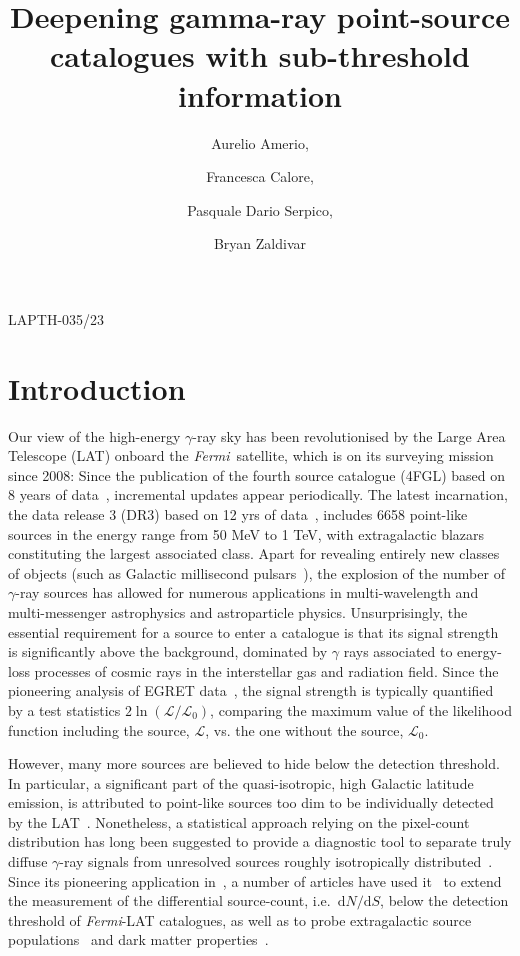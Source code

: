 \documentclass{article}
\date{}
\title{Deepening gamma-ray point-source catalogues with sub-threshold information}
\author[a, 1]{Aurelio Amerio,\note{Corresponding author.}}
\author[b]{Francesca Calore,}
\author[b]{Pasquale Dario Serpico,}
\author[a]{Bryan Zaldivar}
\affiliation[a]{Instituto de F\'isica Corpuscular (IFIC), University of Valencia and CSIC, Calle Catedrático José Beltrán 2, 46980 Paterna, Spain}
\affiliation[b]{Laboratoire d'Annecy de Physique Th\'eorique (LAPTh), CNRS, Univ. Savoie Mont Blanc, F-74940 Annecy, France}
\def\d{\textrm{d}}
\newcommand{\Fermi}{\textit{Fermi}}
\begin{document}
\begin{flushright}
LAPTH-035/23
\end{flushright}

\maketitle


\section{Introduction}

Our view of the high-energy $\gamma$-ray sky has been revolutionised  by the Large Area Telescope (LAT) onboard the \Fermi~satellite, which is on its surveying mission since 2008: Since the publication of the fourth source  catalogue (4FGL) based on 8 years of data~\cite{Fermi-LAT:2019yla}, incremental updates appear periodically. The latest incarnation, the data release 3 (DR3) based on 12 yrs of data~\cite{Fermi-LAT:2022byn}, includes 6658 point-like sources in the energy range from 50 MeV to 1 TeV, with extragalactic blazars constituting the largest associated class. Apart for revealing entirely new classes of objects (such as Galactic millisecond pulsars~\cite{Caraveo:2013lra}), the explosion of the number of $\gamma$-ray sources has allowed for numerous applications in multi-wavelength and multi-messenger astrophysics and astroparticle physics. Unsurprisingly, the essential requirement for a source to enter a catalogue is  that its signal strength is significantly above the background, dominated by $\gamma$ rays associated to energy-loss processes of cosmic rays in the interstellar gas and radiation field. Since the pioneering analysis of EGRET data~\cite{Mattox:1996zz}, the signal strength is typically quantified by a test statistics $2\ln(\mathcal{L}/\mathcal{L}_0)$,  comparing the maximum value of the likelihood function including the source, $\mathcal{L}$, vs. the one without the source, $\mathcal{L}_0$. 

However, many more sources are believed to hide below the detection threshold. In particular, a significant part of the quasi-isotropic, high Galactic latitude emission, is attributed to point-like sources too dim to be individually detected by the LAT~\cite{DGRB-review}. Nonetheless, a statistical approach relying on the pixel-count distribution has long been suggested to provide a diagnostic tool to 
separate truly diffuse $\gamma$-ray signals from unresolved sources roughly isotropically distributed~\cite{Dodelson:2009ih}. Since its pioneering application in~\cite{malyshev2011statistics}, a number of articles have used it~\cite{Cuoco-1pdf,Zechlin:2016pme,Lisanti:2016jub}
to extend the measurement of the differential source-count, i.e.~$\d N/\d S$, below the detection threshold of \Fermi-LAT catalogues, as well as to probe extragalactic source populations~\cite{Manconi:2019ynl} and dark matter properties~\cite{Zechlin:2017uzo,Chang:2018bpt}. 
\end{document}
